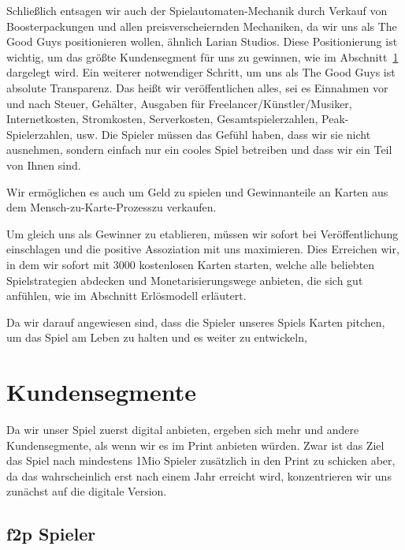 \documentclass[fontsize=12, a4aper]{scrartcl}
\begin{document}
\noindent Schließlich entsagen wir auch der Spielautomaten-Mechanik durch Verkauf von Boosterpackungen und allen preisverscheiernden Mechaniken, da wir uns als \glqq The Good Guys\grqq{} positionieren wollen, ähnlich Larian Studios. Diese Positionierung ist wichtig, um das größte Kundensegment für uns zu gewinnen, wie im Abschnitt~\ref{sec:Kundensegmente} dargelegt wird. Ein weiterer notwendiger Schritt, um uns als \glqq The Good Guys\grqq{} ist absolute Transparenz. Das heißt wir veröffentlichen alles, sei es Einnahmen vor und nach Steuer, Gehälter, Ausgaben für Freelancer/Künstler/Musiker, Internetkosten, Stromkosten, Serverkosten, Gesamtspielerzahlen, Peak-Spielerzahlen, usw. Die Spieler müssen das Gefühl haben, dass wir sie nicht ausnehmen, sondern einfach nur ein cooles Spiel betreiben und dass wir ein Teil von Ihnen sind.\hfill\newline

\noindent Wir ermöglichen es auch um Geld zu spielen und Gewinnanteile an Karten aus dem \glqq Mensch-zu-Karte-Prozess\grqq zu verkaufen.\hfill\newline

\noindent Um gleich uns als Gewinner zu etablieren, müssen wir sofort bei Veröffentlichung einschlagen und die positive Assoziation mit uns maximieren. Dies Erreichen wir, in dem wir sofort mit 3000 kostenlosen Karten starten, welche alle beliebten Spielstrategien abdecken und Monetarisierungswege anbieten, die sich gut anfühlen, wie im Abschnitt \glqq Erlösmodell\grqq{} erläutert.\hfill\newline

\noindent Da wir darauf angewiesen sind, dass die Spieler unseres Spiels Karten pitchen, um das Spiel am Leben zu halten und es weiter zu entwickeln, 

\section{Kundensegmente} \label{sec:Kundensegmente}

Da wir unser Spiel zuerst digital anbieten, ergeben sich mehr und andere Kundensegmente, als wenn wir es im Print anbieten würden. Zwar ist das Ziel das Spiel nach mindestens 1Mio Spieler zusätzlich in den Print zu schicken aber, da das wahrscheinlich erst nach einem Jahr erreicht wird, konzentrieren wir uns zunächst auf die digitale Version.

\subsection{\acl{f2p} Spieler} \label{subsec:f2p_Spieler}
\end{document}
